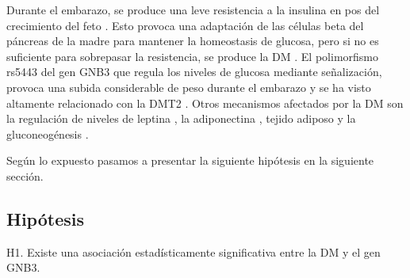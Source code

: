 Durante el embarazo, se produce una leve resistencia a la insulina en pos del crecimiento del feto \cite{Kalhan1999}. Esto provoca una adaptación de las células beta del páncreas de la madre para mantener la homeostasis de glucosa, pero si no es suficiente para sobrepasar la resistencia, se produce la DM \cite{Moyce2018}. El polimorfismo rs5443  del gen GNB3 que regula los niveles de glucosa mediante señalización, provoca una subida considerable de peso durante el embarazo y se ha visto altamente relacionado con la DMT2 \cite{Rizvi2016}. Otros mecanismos afectados por la DM son la regulación de niveles de leptina \cite{Perez2020, Xu2014}, la adiponectina \cite{Plows2018, Xu2014}, tejido adiposo \cite{Plows2018, Desoye2021} y la gluconeogénesis \cite{Catalano2014}.

Según lo expuesto pasamos a presentar la siguiente hipótesis en la siguiente sección.

\subsection{Hipótesis}

H1. Existe una asociación estadísticamente significativa entre la DM y el gen GNB3.